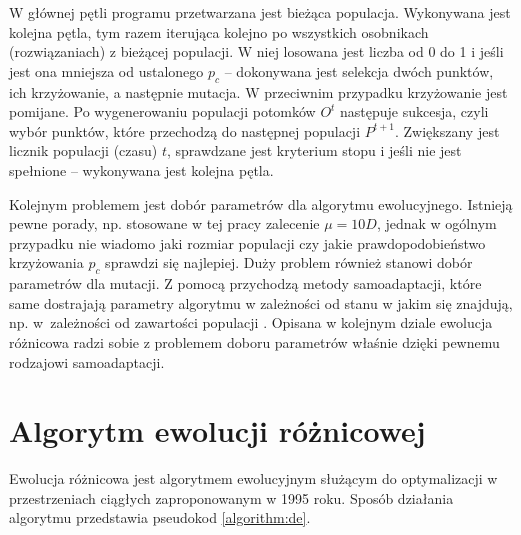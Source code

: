 \documentclass[a4paper,onecolumn,oneside,12pt,wide,floatssmall]{mwrep}
\theoremstyle{definition}
\theoremstyle{plain}%
\theoremstyle{remark}
\begin{document}
W głównej pętli programu przetwarzana jest bieżąca populacja. 
Wykonywana jest kolejna pętla, tym razem iterująca kolejno po wszystkich osobnikach 
(rozwiązaniach) z bieżącej populacji. W niej losowana jest liczba od 0 do 1 i jeśli jest ona mniejsza
od ustalonego $p_c$ -- dokonywana jest selekcja dwóch punktów, ich krzyżowanie, a następnie mutacja.
W przeciwnim przypadku krzyżowanie jest pomijane.
Po wygenerowaniu populacji potomków $O^t$ następuje sukcesja, czyli wybór punktów, które przechodzą
do następnej populacji $P^{t+1}$. Zwiększany jest licznik populacji (czasu) $t$,
sprawdzane jest kryterium stopu i jeśli nie jest spełnione --
wykonywana jest kolejna pętla.
 
Kolejnym problemem jest dobór parametrów dla algorytmu ewolucyjnego. 
Istnieją pewne porady, np. stosowane w tej pracy zalecenie $\mu = 10D$, 
jednak w ogólnym przypadku nie wiadomo jaki rozmiar populacji czy jakie prawdopodobieństwo
krzyżowania $p_c$ sprawdzi się najlepiej. Duży problem również stanowi dobór parametrów dla mutacji.
Z pomocą przychodzą
metody samoadaptacji, które same dostrajają parametry algorytmu w zależności od stanu w jakim się
znajdują, np. w~zależności od zawartości populacji \cite{brest}.
Opisana w kolejnym dziale ewolucja różnicowa radzi sobie z problemem doboru parametrów właśnie dzięki pewnemu rodzajowi
samoadaptacji.

\section{Algorytm ewolucji różnicowej}

Ewolucja różnicowa jest algorytmem ewolucyjnym służącym do optymalizacji
w przestrzeniach ciągłych zaproponowanym w 1995 roku. \cite{storn} Sposób działania algorytmu
przedstawia pseudokod \ref{algorithm:de}.

\usetikzlibrary{decorations.pathreplacing,calc}
\newcommand{\tikzmark}[1]{\tikz[overlay,remember picture] \node (#1) {};}

\newcommand*{\AddNote}[4]{%
    \begin{tikzpicture}[overlay, remember picture]
        \draw [decoration={brace,amplitude=0.5em},decorate,thick]
            ($(#3)!(#1.north)!($(#3)-(0,1)$)$) --  
            ($(#3)!(#2.south)!($(#3)-(0,1)$)$)
                node [align=center, text width=2.5cm, pos=0.5, anchor=west] {#4};
    \end{tikzpicture}
}%
\end{document}

